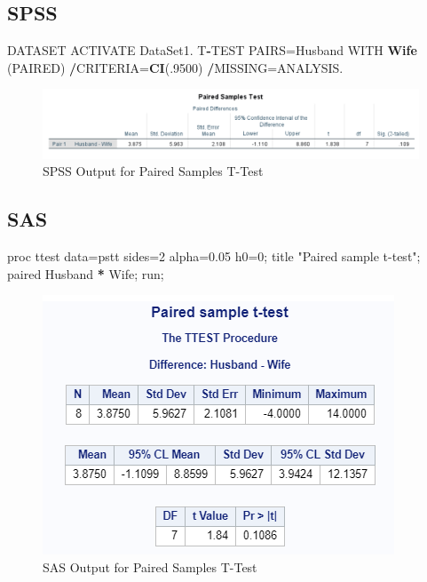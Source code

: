 \documentclass[
]{book}
\newenvironment{Shaded}{\begin{snugshade}}{\end{snugshade}}
\newcommand{\DecValTok}[1]{\textcolor[rgb]{0.00,0.00,0.81}{#1}}
\newcommand{\FloatTok}[1]{\textcolor[rgb]{0.00,0.00,0.81}{#1}}
\newcommand{\KeywordTok}[1]{\textcolor[rgb]{0.13,0.29,0.53}{\textbf{#1}}}
\newcommand{\NormalTok}[1]{#1}
\newcommand{\OperatorTok}[1]{\textcolor[rgb]{0.81,0.36,0.00}{\textbf{#1}}}
\newcommand{\StringTok}[1]{\textcolor[rgb]{0.31,0.60,0.02}{#1}}
\begin{document}
\hypertarget{spss-2}{%
\subsection{SPSS}\label{spss-2}}

\begin{Shaded}
\begin{Highlighting}[]
\NormalTok{DATASET ACTIVATE DataSet1.}
\NormalTok{T}\OperatorTok{-}\NormalTok{TEST PAIRS=Husband WITH }\KeywordTok{Wife}\NormalTok{ (PAIRED)}
  \OperatorTok{/}\NormalTok{CRITERIA=}\KeywordTok{CI}\NormalTok{(.}\DecValTok{9500}\NormalTok{)}
  \OperatorTok{/}\NormalTok{MISSING=ANALYSIS.}
\end{Highlighting}
\end{Shaded}

\begin{figure}[!h]
\includegraphics{Screenshots/Paired Samples T test/psttSPSS} \caption{\label{fig:psttSPSS}SPSS Output for Paired Samples T-Test}\label{fig:psttSPSS}
\end{figure}

\hypertarget{sas-2}{%
\subsection{SAS}\label{sas-2}}

\begin{Shaded}
\begin{Highlighting}[]
\NormalTok{proc ttest data=pstt sides=}\DecValTok{2}\NormalTok{ alpha=}\FloatTok{0.05}\NormalTok{ h0=}\DecValTok{0}\NormalTok{;}
\NormalTok{title }\StringTok{"Paired sample t-test"}\NormalTok{;}
\NormalTok{paired Husband }\OperatorTok{*}\StringTok{ }\NormalTok{Wife;}
\NormalTok{run;}
\end{Highlighting}
\end{Shaded}

\begin{figure}[!h]
\includegraphics{Screenshots/Paired Samples T test/psttSAS} \caption{\label{fig:psttSAS}SAS Output for Paired Samples T-Test}\label{fig:psttSAS}
\end{figure}
\end{document}

